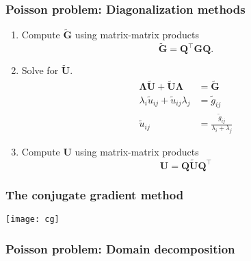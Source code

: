 \begin{frame}
  \frametitle{Poisson problem: Diagonalization methods}
  \begin{enumerate}
  \item Compute $\tilde{\bm G}$ using matrix-matrix products
    \begin{equation*}
      \tilde{\bm G} = \bm Q^\intercal \bm G \bm Q.
    \end{equation*}
  \item Solve for $\tilde{\bm U}$.
    \begin{align*}
      \bm \Lambda \tilde{\bm U} + \tilde{\bm U} \bm \Lambda &= \tilde{\bm G} \\
      \lambda_i \tilde{u}_{ij} + \tilde{u}_{ij} \lambda_j &= \tilde{g}_{ij} \\
      \tilde{u}_{ij} &= \frac{\tilde{g}_{ij}}{\lambda_i + \lambda_j}
    \end{align*}
  \item Compute $\bm U$ using matrix-matrix products
    \begin{equation*}
      \bm U = \bm Q \tilde{\bm U} \bm Q^\intercal
    \end{equation*}
  \end{enumerate}
\end{frame}

\begin{frame}
  \frametitle{The conjugate gradient method}
  \begin{center}
    \texttt{[image: cg]}
  \end{center}
\end{frame}

\begin{frame}
  \frametitle{Poisson problem: Domain decomposition}
  \begin{center}
  \end{center}
\end{frame}


